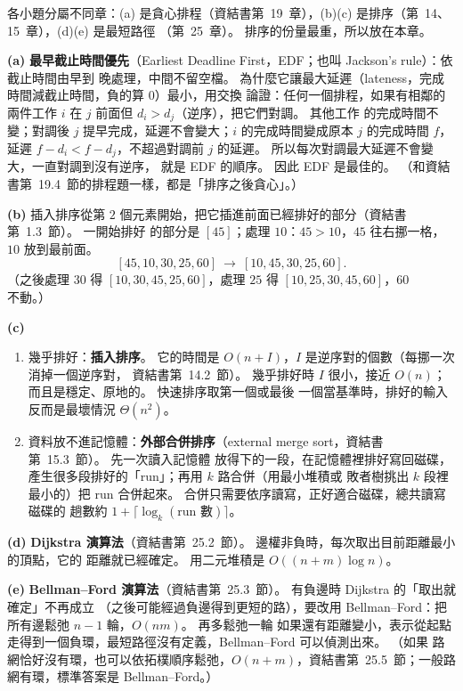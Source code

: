 \begin{pastsoln}
各小題分屬不同章：(a) 是貪心排程（資結書第~19~章），(b)(c) 是排序（第~14、15~章），(d)(e) 是最短路徑
（第~25~章）。 排序的份量最重，所以放在本章。

\textbf{(a)} \textbf{最早截止時間優先}（Earliest Deadline First，EDF；也叫 Jackson's rule）：依截止時間由早到
晚處理，中間不留空檔。 為什麼它讓最大延遲（lateness，完成時間減截止時間，負的算 $0$）最小，用交換
論證：任何一個排程，如果有相鄰的兩件工作 $i$ 在 $j$ 前面但 $d_i > d_j$（逆序），把它們對調。 其他工作
的完成時間不變；對調後 $j$ 提早完成，延遲不會變大；$i$ 的完成時間變成原本 $j$ 的完成時間 $f$，延遲
$f - d_i < f - d_j$，不超過對調前 $j$ 的延遲。 所以每次對調最大延遲不會變大，一直對調到沒有逆序，
就是 EDF 的順序。 因此 EDF 是最佳的。 （和資結書第~19.4~節的排程題一樣，都是「排序之後貪心」。）

\textbf{(b)} 插入排序從第 $2$ 個元素開始，把它插進前面已經排好的部分（資結書第~1.3~節）。 一開始排好
的部分是 $[45]$；處理 $10$：$45 > 10$，$45$ 往右挪一格，$10$ 放到最前面。
\[
[45, 10, 30, 25, 60] \ \longrightarrow\ [10, 45, 30, 25, 60].
\]
（之後處理 $30$ 得 $[10, 30, 45, 25, 60]$，處理 $25$ 得 $[10, 25, 30, 45, 60]$，$60$ 不動。）

\textbf{(c)}
\begin{enumerate}
\item 幾乎排好：\textbf{插入排序}。 它的時間是 $O(n + I)$，$I$ 是逆序對的個數（每挪一次消掉一個逆序對，
資結書第~14.2~節）。 幾乎排好時 $I$ 很小，接近 $O(n)$；而且是穩定、原地的。 快速排序取第一個或最後
一個當基準時，排好的輸入反而是最壞情況 $\Theta(n^2)$。
\item 資料放不進記憶體：\textbf{外部合併排序}（external merge sort，資結書第~15.3~節）。 先一次讀入記憶體
放得下的一段，在記憶體裡排好寫回磁碟，產生很多段排好的「run」；再用 $k$ 路合併（用最小堆積或
敗者樹挑出 $k$ 段裡最小的）把 run 合併起來。 合併只需要依序讀寫，正好適合磁碟，總共讀寫磁碟的
趟數約 $1 + \lceil \log_k(\text{run 數}) \rceil$。
\end{enumerate}

\textbf{(d)} \textbf{Dijkstra 演算法}（資結書第~25.2~節）。 邊權非負時，每次取出目前距離最小的頂點，它的
距離就已經確定。 用二元堆積是 $O((n + m)\log n)$。

\textbf{(e)} \textbf{Bellman--Ford 演算法}（資結書第~25.3~節）。 有負邊時 Dijkstra 的「取出就確定」不再成立
（之後可能經過負邊得到更短的路），要改用 Bellman--Ford：把所有邊鬆弛 $n - 1$ 輪，$O(nm)$。 再多鬆弛一輪
如果還有距離變小，表示從起點走得到一個負環，最短路徑沒有定義，Bellman--Ford 可以偵測出來。 （如果
路網恰好沒有環，也可以依拓樸順序鬆弛，$O(n + m)$，資結書第~25.5~節；一般路網有環，標準答案是
Bellman--Ford。）
\end{pastsoln}
